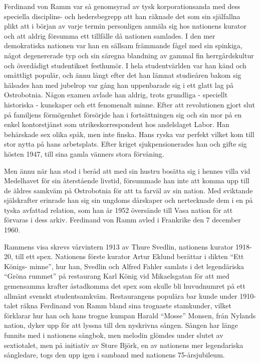 \begin{intersong}
\begin{footnotesize}
\vspace{3mm}
Ferdinand von Ramm var så genomsyrad av tysk
korporationsanda med dess speciella disciplins- och
hedersbegrepp att han räknade det som sin själfallna plikt att
i början av varje termin personligen anmäla sig hos nationens
kurator och att aldrig försumma ett tillfälle då nationen samlades.
I den mer demokratiska nationen var han en sällsam främmande
fågel med sin spinkiga, något degenererade typ och sin säregna
blandning av gammal fin herrgårdskultur och överdådigt
studentikost festhumör. I hela studentvärlden var han känd och
omåttligt populär, och ännu långt efter det han lämnat studieåren
bakom sig hälsades han med jubelrop var gång han uppenbarade
sig i ett glatt lag på Ostrobotnia. Någon examen avlade han
aldrig, trots grundliga - speciellt historiska - kunskaper och ett
fenomenalt minne. Efter att revolutionen gjort slut på familjens
förmögenhet försörjde han i fortsättningen sig och sin mor på
en enkel kontorstjänst som utrikeskorrespondent hos
andelslaget Labor. Han behärskade sex olika spåk, men inte
finska. Hans ryska var perfekt vilket kom till stor nytta på hans
arbetsplats. Efter kriget sjukpensionerades han och gifte sig
hösten 1947, till sina gamla vänners stora förvåning.

\vspace{3mm}
Men ännu när han stod i beråd att med sin hustru bosätta sig i
hennes villa vid Medelhavet för sin återstående livstid,
försummade han inte att komma upp till de äldres samkväm på
Ostrobotnia för att ta farväl av sin nation. Med sviktande
själskrafter erinrade han sig sin ungdoms dårskaper och nertecknade 
dem i en på tyska avfattad relation, som han år
1952 översände till Vasa nation för att förvaras i dess arkiv.
Ferdinand von Ramm avled i Frankrike den 7 december 1960.

\vspace{3mm}
Rammens visa skrevs vårvintern 1913 av Thure Svedlin,
nationens kurator 1918-20, till ett spex. Nationens förste kurator
Artur Eklund berättar i dikten ``Ett Königs- minne'', hur han, Svedlin
och Alfred Fahler samlats i det legendäriska ``Gröna rummet'' på
restaurang Karl König vid Mikaelsgatan för att med gemensamma
krafter åstadkomma det spex som skulle bli huvudnumret på ett
allmänt svenskt studentsamkväm. Restaurangens populära bar
kunde under 1910-talet räkna Ferdinand von Ramm bland sina
trognaste stamkunder, vilket förklarar hur han och hans trogne
kumpan Harald ``Mosse'' Monsen, från Nylands nation, dyker
upp för att lyssna till den nyskrivna sången. Sången har länge
funnits med i nationens sångbok, men melodin glömdes under
slutet av sextiotalet, men på initiativ av Sture Björk, en av
nationens mer legendariska sångledare, togs den upp igen i
samband med nationens 75-årsjubileum.

\end{footnotesize}
\end{intersong}

